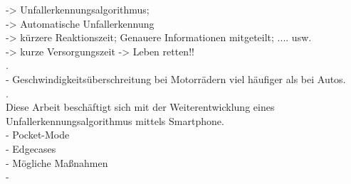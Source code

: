 -> Unfallerkennungsalgorithmus; \\
-> Automatische Unfallerkennung \\
-> kürzere Reaktionszeit; Genauere Informationen mitgeteilt; .... usw.\\
-> kurze Versorgungszeit -> Leben retten!!\\

.\\

-	Geschwindigkeitsüberschreitung bei Motorrädern viel häufiger als bei Autos.\\

.\\

Diese Arbeit beschäftigt sich mit der Weiterentwicklung eines Unfallerkennungsalgorithmus mittels Smartphone. \\
- Pocket-Mode\\
- Edgecases\\
- Mögliche Maßnahmen\\
- 











